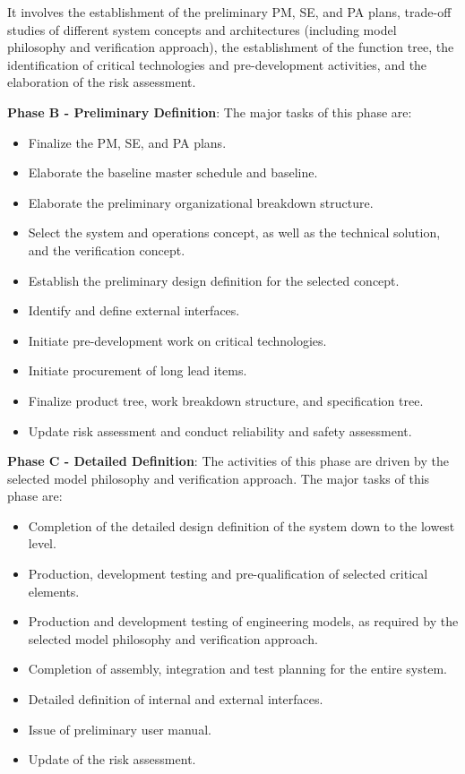  It involves the establishment of the preliminary PM, SE, and PA plans, trade-off studies of different system concepts and architectures (including model philosophy and verification approach), the establishment of the function tree, the identification of critical technologies and pre-development activities, and the elaboration of the risk assessment.

\textbf{Phase B - Preliminary Definition}: The major tasks of this phase are:
\begin{itemize}
\item Finalize the PM, SE, and PA plans.
\item Elaborate the baseline master schedule and baseline.
\item Elaborate the preliminary organizational breakdown structure.
\item Select the system and operations concept, as well as the technical solution, and the verification concept.
\item Establish the preliminary design definition for the selected concept.
\item Identify and define external interfaces.
\item Initiate pre-development work on critical technologies.
\item Initiate procurement of long lead items.
\item Finalize product tree, work breakdown structure, and specification tree.
\item Update risk assessment and conduct reliability and safety assessment.
\end{itemize}

\textbf{Phase C - Detailed Definition}: The activities of this phase are driven by the selected model philosophy and verification approach. The major tasks of this phase are:
\begin{itemize}
\item Completion of the detailed design definition of the system down to the lowest level.
\item Production, development testing and pre-qualification of selected critical elements.
\item Production and development testing of engineering models, as required
by the selected model philosophy and verification approach.
\item Completion of assembly, integration and test planning for the entire system.
\item Detailed definition of internal and external interfaces.
\item Issue of preliminary user manual.
\item Update of the risk assessment.
\end{itemize}

